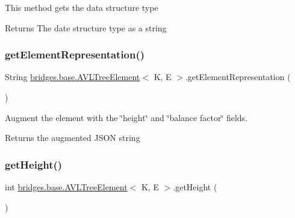 This method gets the data structure type

\begin{DoxyReturn}{Returns}
The date structure type as a string 
\end{DoxyReturn}
\mbox{\label{classbridges_1_1base_1_1_a_v_l_tree_element_af7ab86f2421864daa4fdc2e84939f4ce}} 
\subsubsection{\texorpdfstring{get\+Element\+Representation()}{getElementRepresentation()}}
{\footnotesize\ttfamily String \hyperlink{classbridges_1_1base_1_1_a_v_l_tree_element}{bridges.\+base.\+A\+V\+L\+Tree\+Element}$<$ K, E $>$.get\+Element\+Representation (\begin{DoxyParamCaption}{ }\end{DoxyParamCaption})}

Augment the element with the \char`\"{}height\char`\"{} and \char`\"{}balance factor\char`\"{} fields.

\begin{DoxyReturn}{Returns}
the augmented J\+S\+ON string 
\end{DoxyReturn}
\mbox{\label{classbridges_1_1base_1_1_a_v_l_tree_element_a52fe2886334c841547d238db69022697}} 
\subsubsection{\texorpdfstring{get\+Height()}{getHeight()}}
{\footnotesize\ttfamily int \hyperlink{classbridges_1_1base_1_1_a_v_l_tree_element}{bridges.\+base.\+A\+V\+L\+Tree\+Element}$<$ K, E $>$.get\+Height (\begin{DoxyParamCaption}{ }\end{DoxyParamCaption})}


